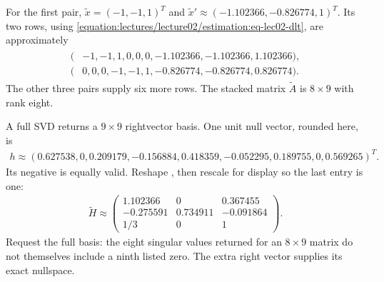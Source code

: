 \documentclass[letterpaper,11pt,english,openany,oneside]{jupyterBook}
\begin{document}
\begin{TextbookBox}
\sphinxAtStartPar
{} For the first pair,
\(\widetilde x=(-1,-1,1)^T\) and \(\widetilde x'\approx(-1.102366,-0.826774,1)^T\).
Its two rows, using \eqref{equation:lectures/lecture02/estimation:eq-lec02-dlt}, are approximately
\begin{equation*}
\begin{split}
\begin{aligned}
(&-1,-1,1,0,0,0,-1.102366,-1.102366,1.102366),\\
(&0,0,0,-1,-1,1,-0.826774,-0.826774,0.826774).
\end{aligned}
\end{split}
\end{equation*}
\sphinxAtStartPar
The other three pairs supply six more rows. The stacked matrix \(\widetilde A\) is \(8\times9\) with rank eight.

\sphinxAtStartPar
{} A full SVD returns a \(9\times9\) right\sphinxhyphen{}vector basis. One unit null vector, rounded here, is
\begin{equation*}
\begin{split}
h\approx(0.627538,0,0.209179,-0.156884,0.418359,-0.052295,
0.189755,0,0.569265)^T.
\end{split}
\end{equation*}
\sphinxAtStartPar
Its negative is equally valid. Reshape , then rescale for display so the last entry is one:
\begin{equation*}
\begin{split}
\widetilde H\approx\begin{pmatrix}
1.102366&0&0.367455\\
-0.275591&0.734911&-0.091864\\
1/3&0&1
\end{pmatrix}.
\end{split}
\end{equation*}
\sphinxAtStartPar
Request the full basis: the eight singular values returned for an \(8\times9\) matrix do not themselves include a ninth listed zero. The extra right vector supplies its exact nullspace.


\end{TextbookBox}
\end{document}

